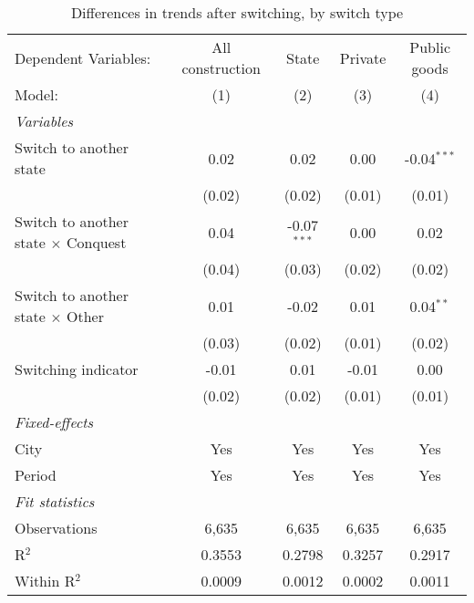 \begin{table}[htbp]
   \caption{\label{tab:window_50y} Differences in trends after switching, by switch type}
   \centering
   \begin{tabular}{lcccc}
      \tabularnewline \midrule \midrule
      Dependent Variables:                       & All construction & State         & Private & Public goods\\  
      Model:                                     & (1)              & (2)           & (3)     & (4)\\  
      \midrule
      \emph{Variables}\\
      Switch to another state                    & 0.02             & 0.02          & 0.00    & -0.04$^{***}$\\   
                                                 & (0.02)           & (0.02)        & (0.01)  & (0.01)\\   
      Switch to another state $\times$ Conquest  & 0.04             & -0.07$^{***}$ & 0.00    & 0.02\\   
                                                 & (0.04)           & (0.03)        & (0.02)  & (0.02)\\   
      Switch to another state $\times$ Other     & 0.01             & -0.02         & 0.01    & 0.04$^{**}$\\   
                                                 & (0.03)           & (0.02)        & (0.01)  & (0.02)\\   
      Switching indicator                        & -0.01            & 0.01          & -0.01   & 0.00\\   
                                                 & (0.02)           & (0.02)        & (0.01)  & (0.01)\\   
      \midrule
      \emph{Fixed-effects}\\
      City                                       & Yes              & Yes           & Yes     & Yes\\  
      Period                                     & Yes              & Yes           & Yes     & Yes\\  
      \midrule
      \emph{Fit statistics}\\
      Observations                               & 6,635            & 6,635         & 6,635   & 6,635\\  
      R$^2$                                      & 0.3553           & 0.2798        & 0.3257  & 0.2917\\  
      Within R$^2$                               & 0.0009           & 0.0012        & 0.0002  & 0.0011\\  
      \midrule \midrule
      

\end{tabular}
\end{table}
